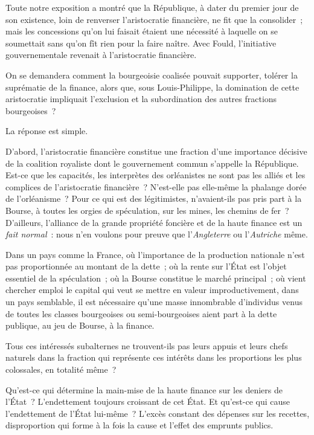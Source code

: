 \documentclass[twoside]{book} %
\begin{document}
Toute notre exposition a montré que la République, à dater du premier jour de son existence, loin de renverser l’aristocratie financière, ne fit que la consolider ; mais les concessions qu’on lui faisait étaient une nécessité à laquelle on se soumettait sans qu’on fît rien pour la faire naître. Avec Fould, l’initiative gouvernementale revenait à l’aristocratie financière.\par
On se demandera comment la bourgeoisie coalisée pouvait supporter, tolérer la suprématie de la finance, alors que, sous Louis-Philippe, la domination de cette aristocratie impliquait l’exclusion et la subordination des autres fractions bourgeoises ?\par
La réponse est simple.\par
D’abord, l’aristocratie financière constitue une fraction d’une importance décisive de la coalition royaliste dont le gouvernement commun s’appelle la République. Est-ce que les capacités, les interprètes des orléanistes ne sont pas les alliés et les complices de l’aristocratie financière ? N’est-elle pas elle-même la phalange dorée de l’orléanisme ? Pour ce qui est des légitimistes, n’avaient-ils pas pris part à la Bourse, à toutes les orgies de spéculation, sur les mines, les chemins de fer ? D’ailleurs, l’alliance de la grande propriété foncière et de la haute finance est un \emph{fait normal} : nous n’en voulons pour preuve que l’\emph{Angleterre} ou l’\emph{Autriche} même.\par
Dans un pays comme la France, où l’importance de la production nationale n’est pas proportionnée au montant de la dette ; où la rente sur l’État est l’objet essentiel de la spéculation ; où la Bourse constitue le marché principal ; où vient chercher emploi le capital qui veut se mettre en valeur improductivement, dans un pays semblable, il est nécessaire qu’une masse innombrable d’individus venus de toutes les classes bourgeoises ou semi-bourgeoises aient part à la dette publique, au jeu de Bourse, à la finance.\par
Tous ces intéressés subalternes ne trouvent-ils pas leurs appuis et leurs chefs naturels dans la fraction qui représente ces intérêts dans les proportions les plus colossales, en totalité même ?\par
Qu’est-ce qui détermine la main-mise de la haute finance sur les deniers de l’État ? L’endettement toujours croissant de cet État. Et qu’est-ce qui cause l’endettement de l’État lui-même ? L’excès constant des dépenses sur les recettes, disproportion qui forme à la fois la cause et l’effet des emprunts publics.\par
\end{document}
